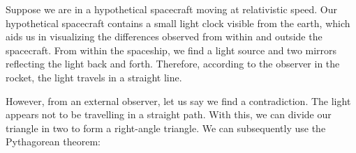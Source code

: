 \documentclass{article}
\begin{document}
	\begin{figure}[h]
	\begin{center}
		
		
	\end{center}
\end{figure}

Suppose we are in a hypothetical spacecraft moving at relativistic speed. Our hypothetical spacecraft contains a small light clock visible from the earth, which aids us in visualizing the differences observed from within and outside the spacecraft. From within the spaceship, we find a light source and two mirrors reflecting the light back and forth. Therefore, according to the observer in the rocket, the light travels in a straight line. 

	\begin{figure}[h]
	\begin{center}	
	\end{center}
\end{figure}

However, from an external observer, let us say we find a contradiction. The light appears not to be travelling in a straight path. With this, we can divide our triangle in two to form a right-angle triangle. We can subsequently use the Pythagorean theorem:
\end{document}

